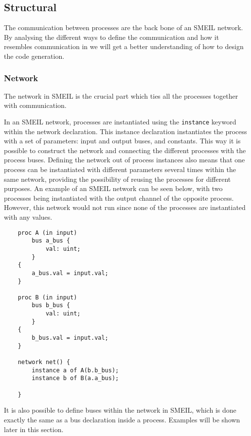 \subsection{Structural}
\label{sec:analysis_structural}
The communication between processes are the back bone of an SMEIL network. By analysing the different ways to define the communication and how it resembles communication in \cspm{} we will get a better understanding of how to design the code generation.
\subsubsection{Network}
The network in SMEIL is the crucial part which ties all the processes together with communication.

In an SMEIL network, processes are instantiated using the \texttt{instance} keyword within the network declaration. This instance declaration instantiates the process with a set of parameters: input and output buses, and constants. This way it is possible to construct the network and connecting the different processes with the process buses.
Defining the network out of process instances also means that one process can be instantiated with different parameters several times within the same network, providing the possibility of reusing the processes for different purposes.
An example of an SMEIL network can be seen below, with two processes being instantiated with the output channel of the opposite process. However, this network would not run since none of the processes are instantiated with any values.
\begin{verbatim}
    proc A (in input)
        bus a_bus {
            val: uint;
        }
    {
        a_bus.val = input.val;
    }

    proc B (in input)
        bus b_bus {
            val: uint;
        }
    {
        b_bus.val = input.val;
    }

    network net() {
        instance a of A(b.b_bus);
        instance b of B(a.a_bus);

    }
\end{verbatim}
It is also possible to define buses within the network in SMEIL, which is done exactly the same as a bus declaration inside a process. Examples will be shown later in this section.\\

